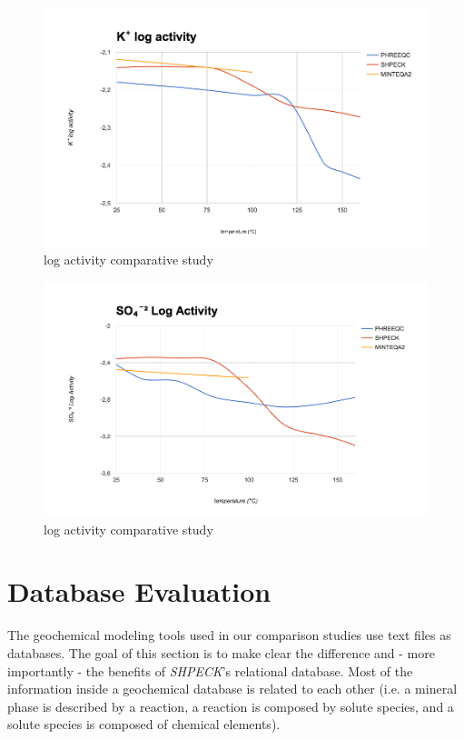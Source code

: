 \begin{figure}[ht!]
\centering
\includegraphics[width=140mm]{figures/k+.png}
\caption{ log activity comparative study}
\label{fig:k+}
\end{figure}

\begin{figure}[ht!]
\centering
\includegraphics[width=140mm]{figures/so4-2.png}
\caption{ log activity comparative study}
\label{fig:so4-2}
\end{figure}


\section{Database Evaluation}
The geochemical modeling tools used in our comparison studies use text files as databases. 
The goal of this section is to make clear the difference and - more importantly - the benefits of \emph{SHPECK}'s relational database. 
Most of the information inside a geochemical database is related to each other (i.e. a mineral phase is described by a reaction, a reaction is composed by solute species, and a solute species is composed of chemical elements).


